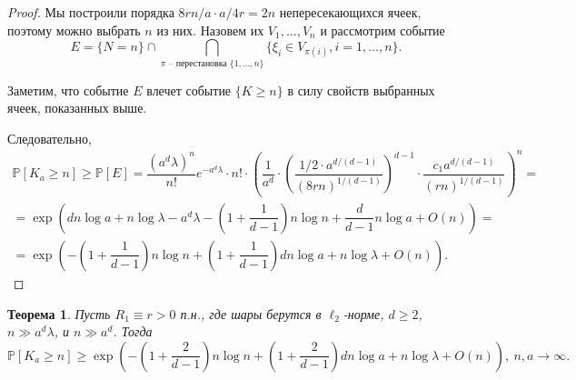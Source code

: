 \documentclass[12pt]{article}
\theoremstyle{plain}
\newtheorem{thm}{Теорема} %
\theoremstyle{definition}
\theoremstyle{remark}
\def\geq{\geqslant}
\newcommand{\PP}{\mathbb{P}}
\begin{document}
\begin{proof}
    
    Мы построили порядка $8rn/a \cdot a/4r = 2n$ непересекающихся ячеек, поэтому можно выбрать $n$ из них. Назовем их $V_1, \ldots, V_n$  и рассмотрим событие $$E = \{N=n\}\cap \bigcap\limits_{\pi \text{ -- перестановка } \{1, \ldots, n\}} \{\xi_i \in V_{\pi(i)}, i = 1, \ldots, n\}.$$
                         
    Заметим, что событие $E$ влечет событие $\{K \geq n\}$ в силу свойств выбранных ячеек, показанных выше.
  
    Следовательно, 
    \begin{multline*}
        \PP[K_a\geq n] \geq \PP[E] = \dfrac{(a^d\lambda)^n}{n!}e^{-a^d\lambda}\cdot n!\cdot \left(\dfrac{1}{a^d}\cdot\left(\dfrac{1/2\cdot a^{d/(d-1)}}{(8rn)^{1/(d-1)}}\right)^{d-1}\cdot \dfrac{c_1a^{d/(d-1)}}{(rn)^{1/(d-1)}}\right)^n = \\
        =\exp\left(dn\log a + n\log\lambda - a^d\lambda - \left(1+\dfrac{1}{d-1}\right)n\log n + \dfrac{d}{d-1} n\log a  + O(n)\right) =\\
        =\exp\left(-\left(1 + \dfrac{1}{d-1}\right)n\log n + \left(1 + \dfrac{1}{d-1}\right)dn\log a + n\log\lambda + O(n)\right).
    \end{multline*}{}
\end{proof}{}

\begin{thm}\label{lowconst2}
Пусть $R_1\equiv r > 0$ п.н., где шары берутся в $\ell_2$-норме, $d\geq 2$,  $n \gg a^d\lambda$, и $n\gg a^d$. 
Тогда $$\PP[K_a \geq n] \geq \exp \left(-\left(1+\dfrac{2}{d-1}\right)n\log n + \left(1+\dfrac{2}{d-1}\right)dn\log a  +n\log\lambda + O(n)\right),\  n, a\to \infty.$$
\end{thm}{}
\end{document}
